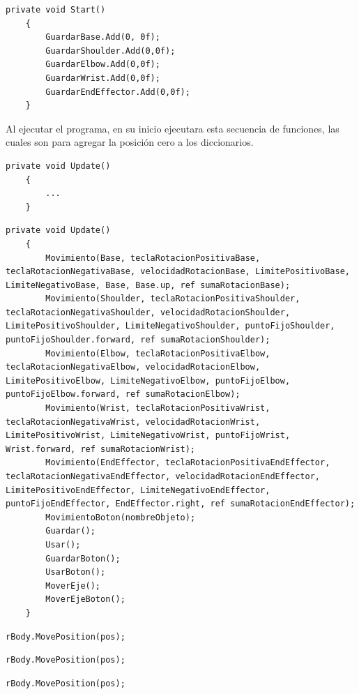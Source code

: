 \begin{lstlisting}[frame=single]
    private void Start()
    {
        GuardarBase.Add(0, 0f);
        GuardarShoulder.Add(0,0f);
        GuardarElbow.Add(0,0f);
        GuardarWrist.Add(0,0f);
        GuardarEndEffector.Add(0,0f);
    }
\end{lstlisting}
Al ejecutar el programa, en su inicio ejecutara esta secuencia de funciones, las cuales son para agregar la posición cero a los diccionarios.

\begin{lstlisting}[frame=single]
    private void Update()
    {
        ...
    }
\end{lstlisting}

\begin{lstlisting}[frame=single]
    private void Update()
    {
        Movimiento(Base, teclaRotacionPositivaBase, teclaRotacionNegativaBase, velocidadRotacionBase, LimitePositivoBase, LimiteNegativoBase, Base, Base.up, ref sumaRotacionBase);
        Movimiento(Shoulder, teclaRotacionPositivaShoulder, teclaRotacionNegativaShoulder, velocidadRotacionShoulder, LimitePositivoShoulder, LimiteNegativoShoulder, puntoFijoShoulder, puntoFijoShoulder.forward, ref sumaRotacionShoulder);
        Movimiento(Elbow, teclaRotacionPositivaElbow, teclaRotacionNegativaElbow, velocidadRotacionElbow, LimitePositivoElbow, LimiteNegativoElbow, puntoFijoElbow, puntoFijoElbow.forward, ref sumaRotacionElbow);
        Movimiento(Wrist, teclaRotacionPositivaWrist, teclaRotacionNegativaWrist, velocidadRotacionWrist, LimitePositivoWrist, LimiteNegativoWrist, puntoFijoWrist, Wrist.forward, ref sumaRotacionWrist);
        Movimiento(EndEffector, teclaRotacionPositivaEndEffector, teclaRotacionNegativaEndEffector, velocidadRotacionEndEffector, LimitePositivoEndEffector, LimiteNegativoEndEffector, puntoFijoEndEffector, EndEffector.right, ref sumaRotacionEndEffector);
        MovimientoBoton(nombreObjeto);
        Guardar();
        Usar();
        GuardarBoton();
        UsarBoton();
        MoverEje();
        MoverEjeBoton();
    }
\end{lstlisting}
\begin{lstlisting}[frame=single]
        rBody.MovePosition(pos);
\end{lstlisting}
\begin{lstlisting}[frame=single]
        rBody.MovePosition(pos);
\end{lstlisting}
\begin{lstlisting}[frame=single]
        rBody.MovePosition(pos);
\end{lstlisting}

